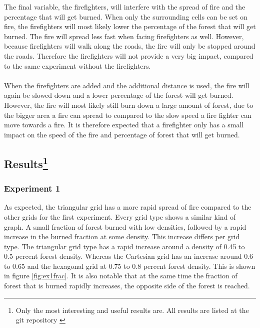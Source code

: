 \documentclass{article}
\begin{document}
\begin{multicols}{2}
The final variable, the firefighters, will interfere with the spread of fire and the percentage that will get burned. When only the surrounding cells can be set on fire, the firefighters will most likely lower the percentage of the forest that will get burned. The fire will spread less fast when facing firefighters as well. However, because firefighters will walk along the roads, the fire will only be stopped around the roads. Therefore the firefighters will not provide a very big impact, compared to the same experiment without the firefighters.\\\\
When the firefighters are added and the additional distance is used, the fire will again be slowed down and a lower percentage of the forest will get burned. However, the fire will most likely still burn down a large amount of forest, due to the bigger area a fire can spread to compared to the slow speed a fire fighter can move towards a fire. It is therefore expected that a firefighter only has a small impact on the speed of the fire and percentage of forest that will get burned.


\subsection*{Results\footnote{Only the most interesting and useful results are. All results are listed at the git repository \cite{allresults}}}
\subsubsection*{Experiment 1}
As expected, the triangular grid has a more rapid spread of fire compared to the other grids for the first experiment. Every grid type shows a similar kind of graph. A small fraction of forest burned with low densities, followed by a rapid increase in the burned fraction at some density. This increase differs per grid type. The triangular grid type has a rapid increase around a density of 0.45 to 0.5 percent forest density. Whereas the Cartesian grid has an increase around 0.6 to 0.65 and the hexagonal grid at 0.75 to 0.8 percent forest density. This is shown in figure \ref{fig:ex1frac}. It is also notable that at the same time the fraction of forest that is burned rapidly increases, the opposite side of the forest is reached.


\end{multicols}
\end{document}
